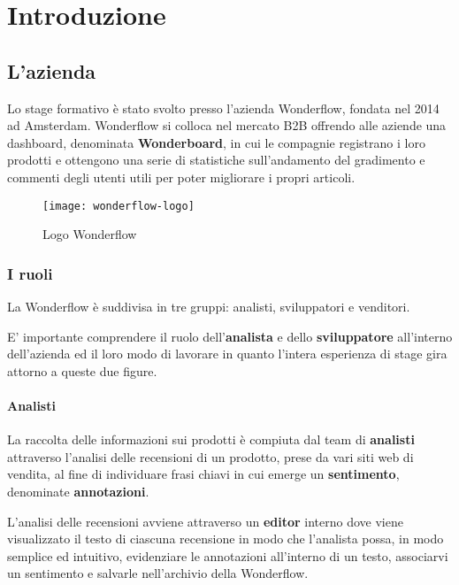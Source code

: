 \mainmatter
\chapter{Introduzione}
\label{cap:introduzione}

\section{L'azienda}
Lo stage formativo è stato svolto presso l'azienda Wonderflow, fondata nel 2014
ad Amsterdam. Wonderflow si colloca nel mercato \gls{B2B}
offrendo alle aziende una \gls{dashboard}, denominata \textbf{Wonderboard}, in
cui le compagnie registrano i loro prodotti e ottengono una serie di
statistiche sull'andamento del gradimento e commenti degli utenti utili per
poter migliorare i propri articoli.

\begin{figure}[htbp]
\begin{center}
\texttt{[image: wonderflow-logo]}
\caption{Logo Wonderflow}
\end{center}
\end{figure}

\subsection{I ruoli}
La Wonderflow è suddivisa in tre gruppi: analisti, sviluppatori e venditori.

E' importante comprendere il ruolo dell'\textbf{analista} e dello
\textbf{sviluppatore} all'interno dell'azienda ed il loro modo di lavorare in
quanto l'intera esperienza di stage gira attorno a queste due figure.

\subsubsection{Analisti}
La raccolta delle informazioni sui prodotti è compiuta dal team di
\textbf{analisti} attraverso l'analisi delle recensioni di un prodotto, prese
da vari siti web di vendita, al fine di individuare frasi chiavi in cui
emerge un \textbf{sentimento}, denominate \textbf{annotazioni}.
\newline

L'analisi delle recensioni avviene attraverso un \textbf{editor} interno dove
viene visualizzato il testo di ciascuna recensione in modo che l'analista
possa, in modo semplice ed intuitivo, evidenziare le annotazioni all'interno di
un testo, associarvi un sentimento e salvarle nell'archivio della Wonderflow.
\newline

